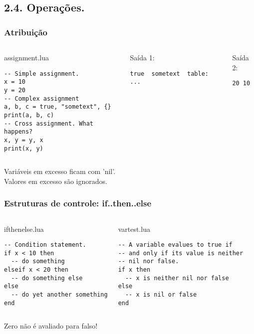 \documentclass[brazil]{beamer}
\begin{document}
\subsection{2.4. Operações.}

\begin{frame}[fragile]
  \frametitle{Atribuição}
  \pause
  \begin{columns}
      \begin{block}{assignment.lua}
        \begin{lstlisting}
-- Simple assignment.
x = 10
y = 20
-- Complex assignment
a, b, c = true, "sometext", {}
print(a, b, c)
-- Cross assignment. What happens?
x, y = y, x
print(x, y)
        \end{lstlisting}
      \end{block}
    \pause
      \begin{block}{Saída 1:}
        \begin{verbatim}
true  sometext  table: ... \end{verbatim}
      \end{block}
      \pause
      \begin{block}{Saída 2:}
        \begin{verbatim}
20 10 \end{verbatim}
      \end{block}
  \end{columns}
  \pause
  \begin{center}
    Variáveis em excesso ficam com 'nil'. \\
    Valores em excesso são ignorados.
  \end{center}
\end{frame}


\begin{frame}[fragile]
  \frametitle{Estruturas de controle: if..then..else}
  \pause
  \begin{columns}
      \begin{block}{ifthenelse.lua}
        \begin{lstlisting}
-- Condition statement.
if x < 10 then
  -- do something
elseif x < 20 then
  -- do something else
else
  -- do yet another something
end 
        \end{lstlisting}
      \end{block}
    \pause
      \begin{block}{vartest.lua}
        \begin{lstlisting}
-- A variable evalues to true if
-- and only if its value is neither
-- nil nor false.
if x then
  -- x is neither nil nor false
else
  -- x is nil or false
end
        \end{lstlisting}
      \end{block}
  \end{columns}
  \pause
  \begin{center}
    Zero não é avaliado para falso!
  \end{center}
\end{frame}
\end{document}
